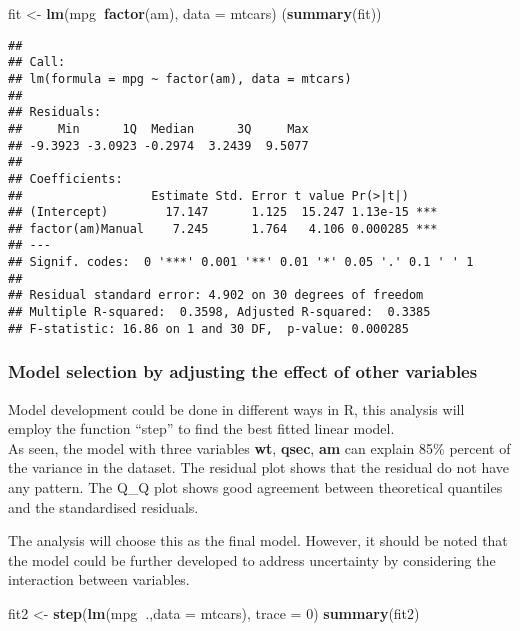 \documentclass[]{article}
\newenvironment{Shaded}{\begin{snugshade}}{\end{snugshade}}
\newcommand{\KeywordTok}[1]{\textcolor[rgb]{0.13,0.29,0.53}{\textbf{#1}}}
\newcommand{\DataTypeTok}[1]{\textcolor[rgb]{0.13,0.29,0.53}{#1}}
\newcommand{\DecValTok}[1]{\textcolor[rgb]{0.00,0.00,0.81}{#1}}
\newcommand{\StringTok}[1]{\textcolor[rgb]{0.31,0.60,0.02}{#1}}
\newcommand{\OperatorTok}[1]{\textcolor[rgb]{0.81,0.36,0.00}{\textbf{#1}}}
\newcommand{\NormalTok}[1]{#1}
\begin{document}
\begin{Shaded}
\begin{Highlighting}[]
\NormalTok{fit <-}\StringTok{ }\KeywordTok{lm}\NormalTok{(mpg}\OperatorTok{~}\KeywordTok{factor}\NormalTok{(am), }\DataTypeTok{data =}\NormalTok{ mtcars)}
\NormalTok{(}\KeywordTok{summary}\NormalTok{(fit))}
\end{Highlighting}
\end{Shaded}

\begin{verbatim}
## 
## Call:
## lm(formula = mpg ~ factor(am), data = mtcars)
## 
## Residuals:
##     Min      1Q  Median      3Q     Max 
## -9.3923 -3.0923 -0.2974  3.2439  9.5077 
## 
## Coefficients:
##                  Estimate Std. Error t value Pr(>|t|)    
## (Intercept)        17.147      1.125  15.247 1.13e-15 ***
## factor(am)Manual    7.245      1.764   4.106 0.000285 ***
## ---
## Signif. codes:  0 '***' 0.001 '**' 0.01 '*' 0.05 '.' 0.1 ' ' 1
## 
## Residual standard error: 4.902 on 30 degrees of freedom
## Multiple R-squared:  0.3598, Adjusted R-squared:  0.3385 
## F-statistic: 16.86 on 1 and 30 DF,  p-value: 0.000285
\end{verbatim}

\subsubsection{Model selection by adjusting the effect of other
variables}\label{model-selection-by-adjusting-the-effect-of-other-variables}

Model development could be done in different ways in R, this analysis
will employ the function ``step'' to find the best fitted linear
model.\\
As seen, the model with three variables \textbf{wt}, \textbf{qsec},
\textbf{am} can explain 85\% percent of the variance in the dataset. The
residual plot shows that the residual do not have any pattern. The Q\_Q
plot shows good agreement between theoretical quantiles and the
standardised residuals.

The analysis will choose this as the final model. However, it should be
noted that the model could be further developed to address uncertainty
by considering the interaction between variables.

\begin{Shaded}
\begin{Highlighting}[]
\NormalTok{fit2 <-}\StringTok{ }\KeywordTok{step}\NormalTok{(}\KeywordTok{lm}\NormalTok{(mpg}\OperatorTok{~}\NormalTok{.,}\DataTypeTok{data =}\NormalTok{ mtcars), }\DataTypeTok{trace =} \DecValTok{0}\NormalTok{)}
\KeywordTok{summary}\NormalTok{(fit2)}
\end{Highlighting}
\end{Shaded}
\end{document}
